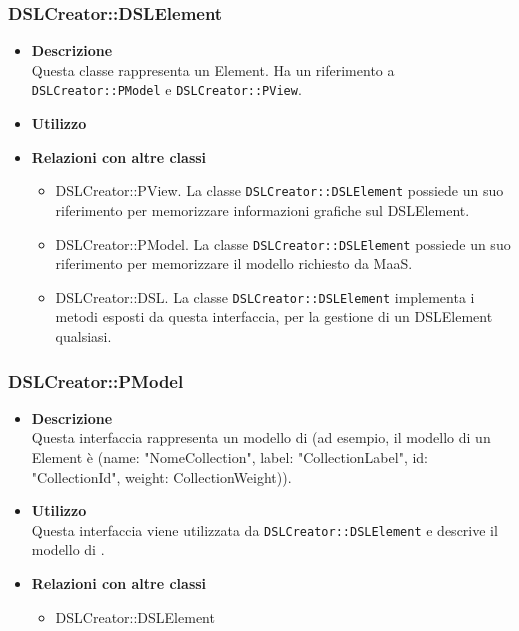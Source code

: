         \subsubsection{DSLCreator::DSLElement}
        \begin{itemize}
        \item \textbf{Descrizione} \hfill \\
          Questa classe rappresenta un  Element. Ha un riferimento a \texttt{DSLCreator::PModel} e \texttt{DSLCreator::PView}.
        \item \textbf{Utilizzo}  \hfill \\
        \item \textbf{Relazioni con altre classi} \hfill 
          \begin{itemize}
          \item DSLCreator::PView. La classe \texttt{DSLCreator::DSLElement} possiede un suo riferimento per memorizzare informazioni grafiche sul DSLElement.
          \item DSLCreator::PModel. La classe \texttt{DSLCreator::DSLElement} possiede un suo riferimento per memorizzare il modello richiesto da MaaS. 
          \item DSLCreator::DSL. La classe \texttt{DSLCreator::DSLElement} implementa i metodi esposti da questa interfaccia, per la gestione di un DSLElement qualsiasi.
          \end{itemize}
        \end{itemize}

        \subsubsection{DSLCreator::PModel}
        \begin{itemize}
        \item \textbf{Descrizione} \hfill \\
          Questa interfaccia rappresenta un modello di  (ad esempio, il modello  di un  Element \`{e} (name: "NomeCollection", label: "CollectionLabel", id: "CollectionId", weight: CollectionWeight)).
        \item \textbf{Utilizzo}  \hfill \\
          Questa interfaccia viene utilizzata da \texttt{DSLCreator::DSLElement} e descrive il modello di .
        \item \textbf{Relazioni con altre classi} \hfill 
          \begin{itemize}
          \item DSLCreator::DSLElement
          \end{itemize}
        \end{itemize}

